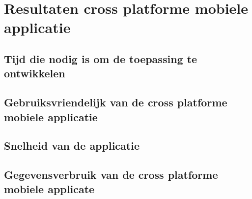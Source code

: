 \chapter{Resultaten cross platforme mobiele applicatie}
\label{ch:resultatencrossplatformapp}
\section{Tijd die nodig is om de toepassing te ontwikkelen}

\section{Gebruiksvriendelijk van de cross platforme mobiele applicatie}

\section{Snelheid van de applicatie}

\section{Gegevensverbruik van de cross platforme mobiele applicate}

